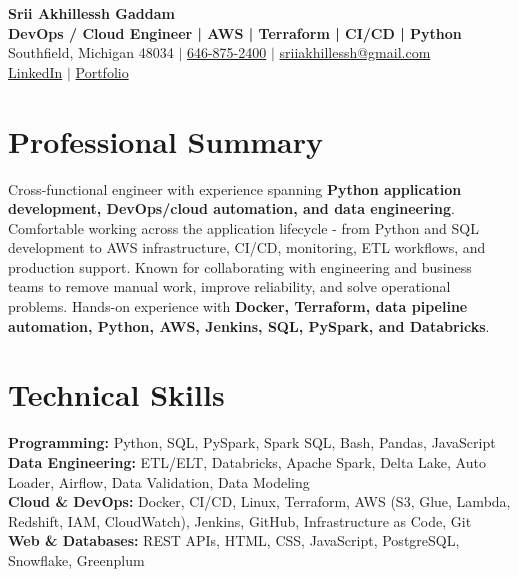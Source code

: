 \documentclass[letterpaper,10pt]{article}
\begin{document}
\fontsize{9.35pt}{10.45pt}\selectfont

\begin{center}
    {\LARGE \textbf{Srii Akhillessh Gaddam}} \\[-1pt]
    \textbf{DevOps / Cloud Engineer | AWS | Terraform | CI/CD | Python} \\[2pt]
    Southfield, Michigan 48034 $|$
    \href{tel:6468752400}{646-875-2400} $|$
    \href{mailto:sriiakhillessh@gmail.com}{sriiakhillessh@gmail.com} \\[1pt]
    \href{https://www.linkedin.com/in/srii-akhiilessh-gaddam-b48668191/}{LinkedIn} $|$
    \href{https://sriiakhillesshg.github.io/portfolio/}{Portfolio}
\end{center}
\vspace{-8pt}

\section{Professional Summary}
\small{Cross-functional engineer with experience spanning \textbf{Python application development, DevOps/cloud automation, and data engineering}. Comfortable working across the application lifecycle - from Python and SQL development to AWS infrastructure, CI/CD, monitoring, ETL workflows, and production support. Known for collaborating with engineering and business teams to remove manual work, improve reliability, and solve operational problems. Hands-on experience with \textbf{Docker, Terraform, data pipeline automation, Python, AWS, Jenkins, SQL, PySpark, and Databricks}.}

\section{Technical Skills}
\small{
\textbf{Programming:} Python, SQL, PySpark, Spark SQL, Bash, Pandas, JavaScript \\
\textbf{Data Engineering:} ETL/ELT, Databricks, Apache Spark, Delta Lake, Auto Loader, Airflow, Data Validation, Data Modeling \\
\textbf{Cloud \& DevOps:} Docker, CI/CD, Linux, Terraform, AWS (S3, Glue, Lambda, Redshift, IAM, CloudWatch), Jenkins, GitHub, Infrastructure as Code, Git \\
\textbf{Web \& Databases:} REST APIs, HTML, CSS, JavaScript, PostgreSQL, Snowflake, Greenplum
}
\end{document}
